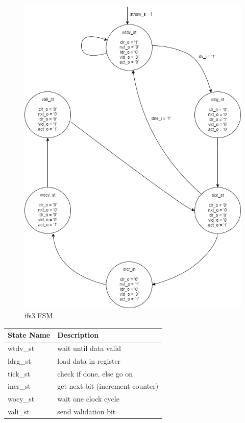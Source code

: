 \documentclass[12pt,a4 paper] {report}
\begin{document}
\begin{figure}[h]
	\centering	
	\includegraphics[scale=0.5]{../png/ifs3.png}
	\caption{ifs3 FSM}
\end{figure}
\begin{center}
 \begin{tabular}{| p{4cm} | p{7cm} |}
	 \hline
	 \textbf{State Name} & \textbf{Description} \\
	 \hline
	 wtdv\_st & wait until data valid \\
	 \hline
	 ldrg\_st & load data in register \\
	 \hline
	 tick\_st & check if done, else go on \\
	 \hline
	 incr\_st & get next bit (increment counter) \\
	 \hline
	 wocy\_st & wait one clock cycle \\
	 \hline
	 vali\_st & send validation bit \\
	 \hline
 \end{tabular}
\end{center}
\end{document}
